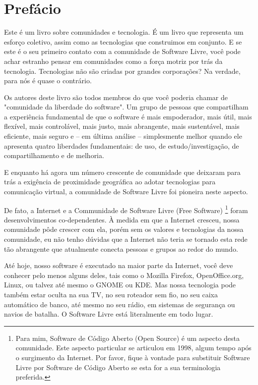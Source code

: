 \section*{Prefácio}

Este é um livro sobre comunidades e tecnologia. É um livro que
representa um esforço coletivo, assim como as tecnologias que
construimos em conjunto. E se este é o seu primeiro contato com
a comunidade de Software Livre, você pode achar estranho pensar
em comunidades como a força motriz por trás da tecnologia. Tecnologias
não são criadas por grandes corporações? Na verdade, para nós é
quase o contrário.

Os autores deste livro são todos membros do que você poderia chamar
de "comunidade da liberdade do software". Um grupo de pessoas que
compartilham a experiência fundamental de que o software é mais
empoderador, mais útil, mais flexível, mais controlável, mais justo,
mais abrangente, mais sustentável, mais eficiente, mais seguro e --
em última análise -- simplesmente melhor quando ele apresenta quatro
liberdades fundamentais: de uso, de estudo/investigação, de compartilhamento
e de melhoria.

E enquanto há agora um número crescente de comunidade que deixaram para
trás a exigência de proximidade geográfica ao adotar tecnologias para
comunicação virtual, a comunidade de Software Livre foi pioneira neste
aspecto.

De fato, a Internet e a Communidade de Software Livre (Free Software)
\footnote{Para mim, Software de Código Aberto (Open Source) é um aspecto
desta comunidade. Este aspecto particular se articulou em 1998, algum
tempo após o surgimento da Internet. Por favor, fique à vontade para
substituir Software Livre por Software de Código Aberto se esta for a
sua terminologia preferida.} foram desenvolvimentos co-dependentes. À
medida em que a Internet cresceu, nossa comunidade pôde crescer com ela,
porém sem os valores e tecnologias da nossa comunidade, eu não tenho
dúvidas que a Internet não teria se tornado esta rede tão abrangente
que atualmente conecta pessoas e grupos ao redor do mundo.

Até hoje, nosso software é executado na maior parte da Internet, você
deve conhecer pelo menos alguns deles, tais como o Mozilla Firefox,
OpenOffice.org, Linux, ou talvez até mesmo o GNOME ou KDE. Mas nossa
tecnologia pode também estar oculta na sua TV, no seu roteador sem fio,
no seu caixa automático de banco, até mesmo no seu rádio, em sistemas de
segurança ou navios de batalha. O Software Livre está literalmente em
todo lugar.

